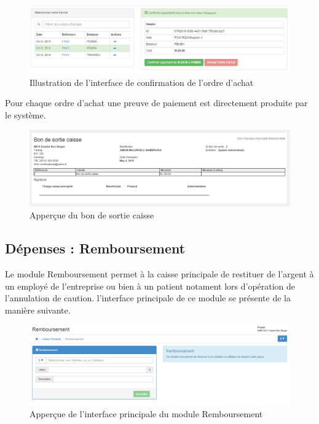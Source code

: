 \documentclass[12pt,a4paper]{report}
\begin{document}
\begin{figure}[h]
\begin{center}
\includegraphics[width=14cm]{pic/ConfOrdreAchat.png}
\end{center}
\caption{Illustration de l'interface de confirmation de l'ordre d'achat}
\label{Illustration de l'interface de confirmation de l'ordre d'achat}
\end{figure}

Pour chaque ordre d'achat une preuve de paiement est directement produite par le système.

\begin{figure}[h]
\begin{center}
\includegraphics[width=14cm]{pic/PreuvePaiement.png}
\end{center}
\caption{Apperçue du bon de sortie caisse}
\label{Apperçue du bon de sortie caisse}
\end{figure}

\newpage
\subsection{Dépenses : Remboursement}
Le module Remboursement permet à la caisse principale de restituer de l'argent à un employé de l'entreprise ou bien à un patient notament lors d'opération de l'annulation de caution. l'interface principale de ce module se présente de la manière suivante.

\begin{figure}[h]
\begin{center}
\includegraphics[width=14cm]{pic/Rembours.png}
\end{center}
\caption{Apperçue de l'interface principale du module Remboursement}
\label{Apperçue de l'interface principale du module Remboursement}
\end{figure}
\end{document}
